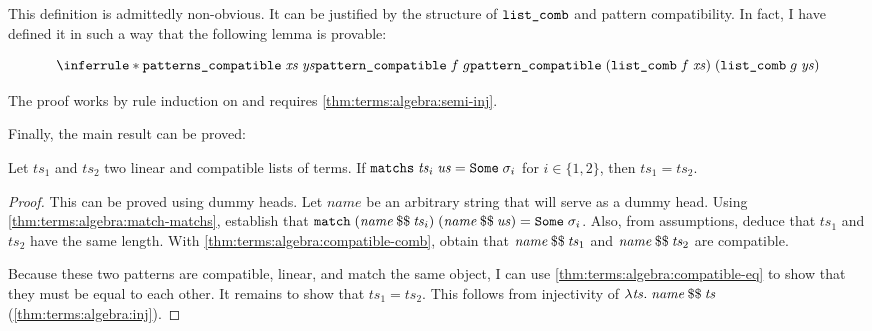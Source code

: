 \noindent
This definition is admittedly non-obvious.
It can be justified by the structure of $\texttt{\textup{list\_comb}}$ and pattern compatibility.
In fact, I have defined it in such a way that the following lemma is provable:
%
\begin{lemma}\label{thm:terms:algebra:compatible-comb}
  \[
    \inferrule*{
      \holconst{patterns\_compatible}\;\mathit{xs}\;\mathit{ys} \\
      \holconst{pattern\_compatible}\;f\;g
    }{
      \holconst{pattern\_compatible}\;(\holconst{list\_comb}\;f\;\mathit{xs})\;(\holconst{list\_comb}\;g\;\mathit{ys})
    }
  \]
\end{lemma}

\noindent
The proof works by rule induction on  and requires \cref{thm:terms:algebra:semi-inj}.

Finally, the main result can be proved:
%
\begin{corollary}\label{thm:terms:algebra:compatibles-eq}
  Let $\mathit{ts}_1$ and $\mathit{ts}_2$ two linear and compatible lists of terms.
  If $\texttt{\textup{matchs}}\;\mathit{ts}_i\;\mathit{us} = \texttt{\textup{Some}}\;\sigma_i$ for $i \in \{1,2\}$, then $\mathit{ts}_1 = \mathit{ts}_2$.
\end{corollary}
%
\begin{proof}
  This can be proved using dummy heads.
  Let $\mathit{name}$ be an arbitrary string that will serve as a dummy head.
  Using \cref{thm:terms:algebra:match-matchs}, establish that $\texttt{\textup{match}}\;(\mathit{name}\mathbin{\$\$}\mathit{ts}_i)\;(\mathit{name}\mathbin{\$\$}\mathit{us}) = \texttt{\textup{Some}}\;\sigma_i$.
  Also, from assumptions, deduce that $\mathit{ts}_1$ and $\mathit{ts}_2$ have the same length.
  With \cref{thm:terms:algebra:compatible-comb}, obtain that $\mathit{name}\mathbin{\$\$}\mathit{ts}_1$ and $\mathit{name}\mathbin{\$\$}\mathit{ts}_2$ are compatible.

  Because these two patterns are compatible, linear, and match the same object, I can use \cref{thm:terms:algebra:compatible-eq} to show that they must be equal to each other.
  It remains to show that $\mathit{ts}_1 = \mathit{ts}_2$.
  This follows from injectivity of $\lambda \mathit{ts}.\;\mathit{name}\mathbin{\$\$}\mathit{ts}$ (\cref{thm:terms:algebra:inj}).
\end{proof}